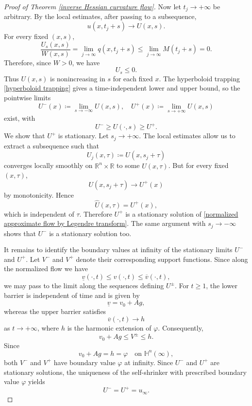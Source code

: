 \documentclass[reqno]{amsart}
\theoremstyle{remark}
\theoremstyle{definition}
\numberwithin{equation}{section}
\begin{document}
\begin{proof}[Proof of Theorem \ref{inverse Hessian curvature flow}]
    Now let $t_j\to+\infty$ be arbitrary. By the local estimates, after passing to a subsequence,
    \[
    u(x,t_j+s)\longrightarrow U(x,s).
    \]
    For every fixed $(x,s)$,
    \[
    \frac{U_s(x,s)}{W(x,s)} = \lim_{j\to\infty}q(x,t_j+s) \leqslant \lim_{j\to\infty}M(t_j+s)=0.
    \]
    Therefore, since $W>0$, we have
    \begin{equation}
    U_s \leqslant 0.
    \end{equation}
    Thus $U(x,s)$ is nonincreasing in $s$ for each fixed $x$. The hyperboloid trapping \eqref{hyperboloid trapping} gives a time-independent lower and upper bound, so the pointwise limits
    \begin{equation}
    U^-(x) \coloneqq \lim_{s\to-\infty}U(x,s), \quad U^+(x) \coloneqq \lim_{s\to+\infty}U(x,s)
    \end{equation}
    exist, with
    \begin{equation}
    U^- \geqslant U(\cdot,s) \geqslant U^+.
    \end{equation}
    We show that $U^+$ is stationary. Let $s_j\to+\infty$. The local estimates allow us to extract a subsequence such that
    \[
    U_j(x,\tau) \coloneqq U(x,s_j+\tau)
    \]
    converges locally smoothly on $\mathbb R^n\times\mathbb R$ to some $\hat U(x,\tau)$. But for every fixed $(x,\tau)$,
    \[
    U(x,s_j+\tau)\longrightarrow U^+(x)
    \]
    by monotonicity. Hence
    \[
    \hat U(x,\tau)=U^+(x),
    \]
    which is independent of $\tau$. Therefore $U^+$ is a stationary solution of \eqref{normalized approximate flow by Legendre transform}. The same argument with $s_j\to-\infty$ shows that $U^-$ is a stationary solution too.

    It remains to identify the boundary values at infinity of the stationary limits $U^-$ and $U^+$. Let $V^-$ and $V^+$ denote their corresponding support functions. Since along the normalized flow we have
    \[
    \underline v(\cdot,t)\leqslant v(\cdot,t)\leqslant \overline v(\cdot,t),
    \]
    we may pass to the limit along the sequences defining $U^\pm$. For $t \geqslant 1$, the lower barrier is independent of time and is given by
    \[
    \underline v=v_0+Ag,
    \]
    whereas the upper barrier satisfies
    \[
    \overline v(\cdot,t) \rightarrow h
    \]
    as $t\to+\infty$, where $h$ is the harmonic extension of $\varphi$. Consequently,
    \[
    v_0+Ag\leqslant V^\pm\leqslant h.
    \]
    Since
    \[
    v_0+Ag=h=\varphi \quad \text{on }\mathbb H^n(\infty),
    \]
    both $V^-$ and $V^+$ have boundary value $\varphi$ at infinity. Since $U^-$ and $U^+$ are stationary solutions, the uniqueness of the self-shrinker with prescribed boundary value $\varphi$ yields
    \[
    U^-=U^+=u_\infty.
    \]


\end{proof}
\end{document}
